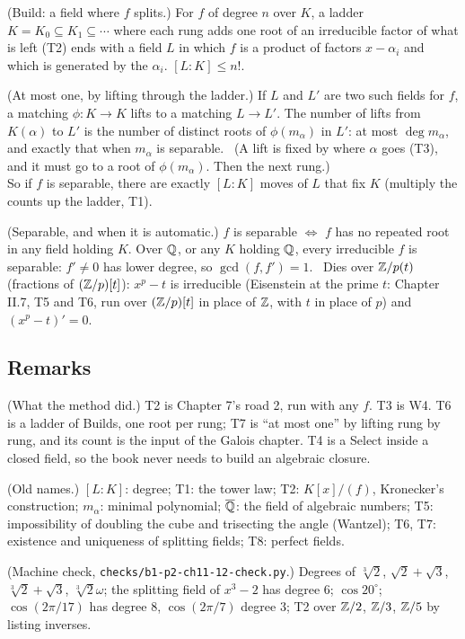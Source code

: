 \begin{lines}
\item[\lab{T6}] (Build: a field where $f$ splits.) For $f$ of degree $n$ over $K$, a ladder $K = K_0 \subseteq K_1 \subseteq \cdots$ where each rung adds one root of an irreducible factor of what is left (T2) ends with a field $L$ in which $f$ is a product of factors $x - \alpha_i$ and which is generated by the $\alpha_i$. $[L : K] \le n!$.
\item[\lab{T7}] (At most one, by lifting through the ladder.) If $L$ and $L'$ are two such fields for $f$, a matching $\phi : K \to K$ lifts to a matching $L \to L'$. The number of lifts from $K(\alpha)$ to $L'$ is the number of distinct roots of $\phi(m_\alpha)$ in $L'$: at most $\deg m_\alpha$, and exactly that when $m_\alpha$ is separable. \ (A lift is fixed by where $\alpha$ goes (T3), and it must go to a root of $\phi(m_\alpha)$. Then the next rung.) \\
So if $f$ is separable, there are exactly $[L : K]$ moves of $L$ that fix $K$ (multiply the counts up the ladder, T1).
\item[\lab{T8}] (Separable, and when it is automatic.) $f$ is separable $\iff$ $f$ has no repeated root in any field holding $K$. Over $\mathbb{Q}$, or any $K$ holding $\mathbb{Q}$, every irreducible $f$ is separable: $f' \ne 0$ has lower degree, so $\gcd(f, f') = 1$. \ Dies over $\mathbb{Z}/p(t)$ (fractions of $(\mathbb{Z}/p)[t]$): $x^p - t$ is irreducible (Eisenstein at the prime $t$: Chapter II.7, T5 and T6, run over $(\mathbb{Z}/p)[t]$ in place of $\mathbb{Z}$, with $t$ in place of $p$) and $(x^p - t)' = 0$.
\end{lines}

\subsection*{Remarks}

\begin{lines}
\item[\lab{R1}] (What the method did.) T2 is Chapter 7's road 2, run with any $f$. T3 is W4. T6 is a ladder of Builds, one root per rung; T7 is ``at most one'' by lifting rung by rung, and its count is the input of the Galois chapter. T4 is a Select inside a closed field, so the book never needs to build an algebraic closure.
\item[\lab{R2}] (Old names.) $[L : K]$: degree; T1: the tower law; T2: $K[x]/(f)$, Kronecker's construction; $m_\alpha$: minimal polynomial; $\overline{\mathbb{Q}}$: the field of algebraic numbers; T5: impossibility of doubling the cube and trisecting the angle (Wantzel); T6, T7: existence and uniqueness of splitting fields; T8: perfect fields.
\item[\lab{R3}] (Machine check, \texttt{checks/b1-p2-ch11-12-check.py}.) Degrees of $\sqrt[3]{2}$, $\sqrt2 + \sqrt3$, $\sqrt[3]{2} + \sqrt3$, $\sqrt[3]{2}\omega$; the splitting field of $x^3 - 2$ has degree $6$; $\cos 20^\circ$; $\cos(2\pi/17)$ has degree $8$, $\cos(2\pi/7)$ degree $3$; T2 over $\mathbb{Z}/2$, $\mathbb{Z}/3$, $\mathbb{Z}/5$ by listing inverses.
\end{lines}

